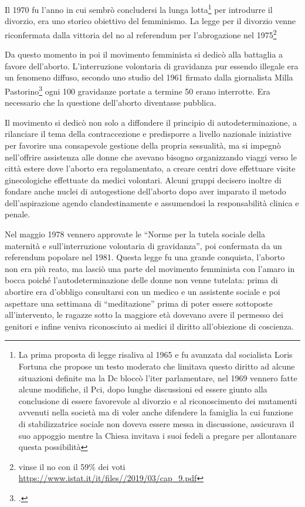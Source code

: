 Il 1970 fu l'anno in cui sembrò concludersi la lunga lotta\footnote{La prima proposta di legge risaliva al 1965 e fu avanzata dal socialista Loris Fortuna che propose un testo moderato che limitava questo diritto ad alcune situazioni definite ma la Dc bloccò l'iter parlamentare, nel 1969 vennero fatte alcune modifiche, il Pci, dopo lunghe discussioni ed essere giunto alla conclusione di essere favorevole al divorzio e al riconoscimento dei mutamenti avvenuti nella società ma di voler anche difendere la famiglia la cui funzione di stabilizzatrice sociale non doveva essere messa in discussione, assicurava il suo appoggio mentre la Chiesa invitava i suoi fedeli a pregare per allontanare questa possibilità} per introdurre il divorzio, era uno storico obiettivo del femminismo.
La legge per il divorzio venne riconfermata dalla vittoria del no al referendum per l'abrogazione nel 1975\footnote{vinse il no con il 59\% dei voti \url{https://www.istat.it/it/files//2019/03/cap_9.pdf}}

Da questo momento in poi il movimento femminista si dedicò alla battaglia a favore dell'aborto. L'interruzione volontaria di gravidanza pur essendo illegale era un fenomeno diffuso, secondo uno studio del 1961 firmato dalla giornalista Milla Pastorino\footcite{Pastorino} ogni 100 gravidanze portate a termine 50 erano interrotte.
Era necessario che la questione dell'aborto diventasse pubblica.

Il movimento  si dedicò non solo a diffondere il principio di autodeterminazione, a rilanciare il tema della contraccezione e predisporre a livello nazionale iniziative per favorire una consapevole gestione della propria sessualità, ma si impegnò nell'offrire assistenza alle donne che avevano bisogno organizzando viaggi verso le città estere dove l'aborto era regolamentato, a creare centri dove effettuare visite ginecologiche effettuate da medici volontari.
Alcuni gruppi decisero inoltre di fondare anche nuclei di autogestione dell'aborto dopo aver imparato il metodo dell'aspirazione agendo clandestinamente e assumendosi la responsabilità clinica e penale.

Nel maggio 1978 vennero approvate le \enquote{Norme per la tutela sociale della maternità e sull'interruzione volontaria di gravidanza}, poi confermata da un referendum popolare nel 1981.
Questa legge fu una grande conquista, l'aborto non era più reato, ma lasciò una parte del movimento femminista con l'amaro in bocca poiché l'autodeterminazione delle donne non venne tutelata: prima di abortire era d'obbligo consultarsi con un medico e un assistente sociale e poi aspettare una settimana di \enquote{meditazione} prima di poter essere sottoposte all'intervento, le ragazze sotto la maggiore età dovevano avere il permesso dei genitori e infine veniva riconosciuto ai medici il diritto all'obiezione di coscienza.

